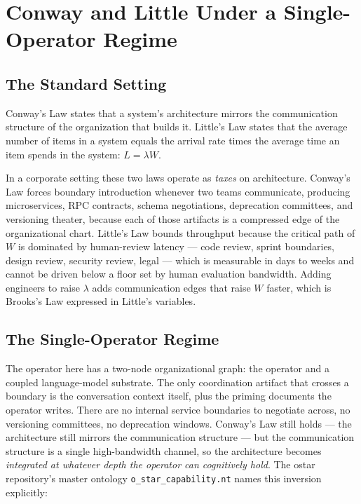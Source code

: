 \documentclass[11pt,letterpaper]{article}
\begin{document}
\section{Conway and Little Under a Single-Operator Regime}

\subsection{The Standard Setting}

Conway's Law states that a system's architecture mirrors the communication structure of the organization that builds it. Little's Law states that the average number of items in a system equals the arrival rate times the average time an item spends in the system: $L = \lambda W$.

In a corporate setting these two laws operate as \emph{taxes} on architecture. Conway's Law forces boundary introduction whenever two teams communicate, producing microservices, RPC contracts, schema negotiations, deprecation committees, and versioning theater, because each of those artifacts is a compressed edge of the organizational chart. Little's Law bounds throughput because the critical path of $W$ is dominated by human-review latency --- code review, sprint boundaries, design review, security review, legal --- which is measurable in days to weeks and cannot be driven below a floor set by human evaluation bandwidth. Adding engineers to raise $\lambda$ adds communication edges that raise $W$ faster, which is Brooks's Law expressed in Little's variables.

\subsection{The Single-Operator Regime}

The operator here has a two-node organizational graph: the operator and a coupled language-model substrate. The only coordination artifact that crosses a boundary is the conversation context itself, plus the priming documents the operator writes. There are no internal service boundaries to negotiate across, no versioning committees, no deprecation windows. Conway's Law still holds --- the architecture still mirrors the communication structure --- but the communication structure is a single high-bandwidth channel, so the architecture becomes \emph{integrated at whatever depth the operator can cognitively hold}. The ostar repository's master ontology \texttt{o\_star\_capability.nt} names this inversion explicitly:
\end{document}
